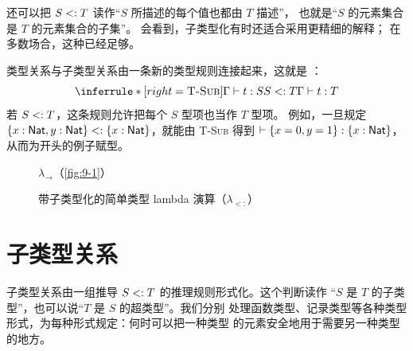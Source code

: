 还可以把 \(S\mathrel{<:} T\) 读作“\(S\) 所描述的每个值也都由 \(T\) 描述”，
也就是“\(S\) 的元素集合是 \(T\) 的元素集合的子集”。
会看到，子类型化有时还适合采用更精细的解释；
在多数场合，这种已经足够。

类型关系与子类型关系由一条新的类型规则连接起来，这就是
：
\[
\inferrule*[right=\textsc{T-Sub}]
 {\Gamma\vdash t:S\\S\subtype T}
 {\Gamma\vdash t:T}
\]
若 \(S\mathrel{<:} T\)，这条规则允许把每个 \(S\) 型项也当作 \(T\) 型项。
例如，一旦规定
\(\{x:\mathsf{Nat},y:\mathsf{Nat}\}\mathrel{<:}
\{x:\mathsf{Nat}\}\)，就能由 \textsc{T-Sub} 得到
\(\vdash\{x=0,y=1\}:\{x:\mathsf{Nat}\}\)，从而为开头的例子赋型。

\begin{figure}[!ht]
\centering
\begin{minipage}{0.98\linewidth}
\small
\taplfigureheader{\(\lambda_{<:}\)}
  {\(\lambda_{\to}\)（\cref{fig:9-1}）}
\end{minipage}
\caption{带子类型化的简单类型 lambda 演算（\(\lambda_{<:}\)）}
\label{fig:15-1}
\end{figure}

\section{子类型关系}
\label{sec:15.2}

子类型关系由一组推导 \(S\mathrel{<:} T\) 的推理规则形式化。这个判断读作
“\(S\) 是 \(T\) 的子类型”，也可以说“\(T\) 是 \(S\) 的超类型”。我们分别
处理函数类型、记录类型等各种类型形式，为每种形式规定：何时可以把一种类型
的元素安全地用于需要另一种类型的地方。

